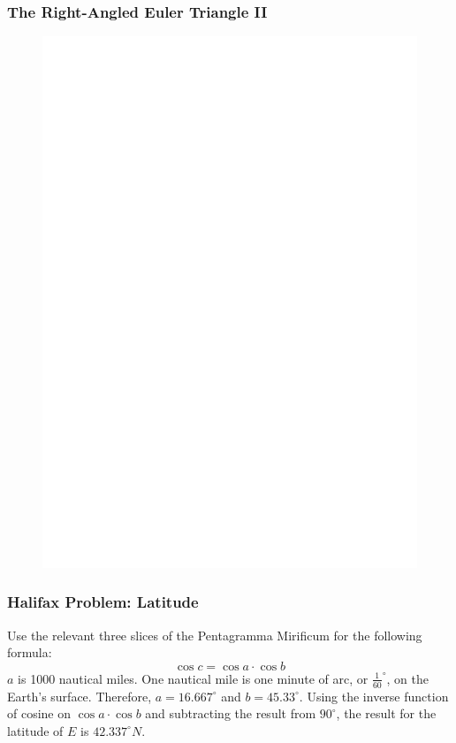 \documentclass[xcolor=dvipsnames]{beamer}
\begin{document}
\begin{frame}
  \frametitle{The Right-Angled Euler Triangle II}
  \begin{figure}[h]
    \includegraphics[scale=.7]{./bcita-05.eps}
  \end{figure}
\end{frame}

\begin{frame}
  \frametitle{Halifax Problem: Latitude}
Use the relevant three slices of the Pentagramma Mirificum for the
following formula:
\begin{equation}
  \label{eq:aeceiwae}
\cos{}c=\cos{}a\cdot\cos{}b  
\end{equation}
$a$ is 1000 nautical miles. One nautical mile is one minute of arc, or
$\frac{1}{60}^{\circ}$, on the Earth's surface. Therefore,
$a=16.667^{\circ}$ and $b=45.33^{\circ}$. Using the inverse function
of cosine on $\cos{}a\cdot\cos{}b$ and subtracting the result from
$90^{\circ}$, the result for the latitude of $E$ is $42.337^{\circ}N$.
\end{frame}
\end{document}
